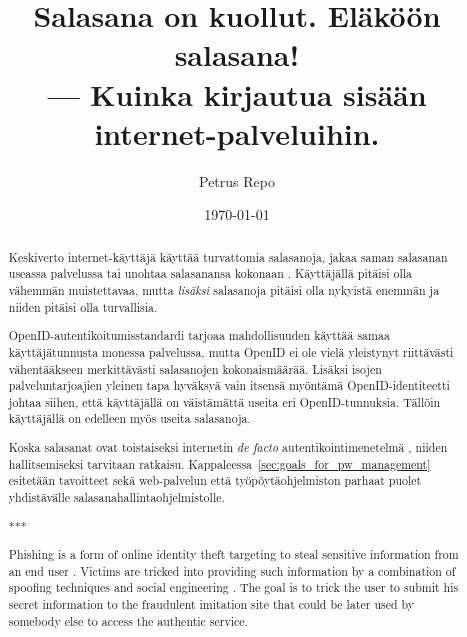 \documentclass[english,gradu]{tktltiki}
\begin{document}
\title{Salasana on kuollut. Eläköön salasana!\\ --- Kuinka kirjautua sisään internet-palveluihin.}
\author{Petrus Repo}
\date{\today}
\maketitle


\onehalfspacing

\subject{Tietojenkäsittelytiede}


\begin{abstract}

Keskiverto internet-käyttäjä käyttää turvattomia salasanoja, jakaa saman salasanan useassa palvelussa tai unohtaa salasanansa kokonaan \cite{study_of_passwords_07, password_management_strategies_06, generating_and_remembering_pws_04, users_are_not_the_enemy_99}. Käyttäjällä pitäisi olla vähemmän muistettavaa, mutta \emph{lisäksi} salasanoja pitäisi olla nykyistä enemmän ja niiden pitäisi olla turvallisia.

OpenID-autentikoitumisstandardi tarjoaa mahdollisuuden käyttää samaa käyttäjätunnusta monessa palvelussa, mutta OpenID ei ole vielä yleistynyt riittävästi vähentääkseen merkittävästi salasanojen kokonaismäärää. Lisäksi isojen palveluntarjoajien yleinen tapa hyväksyä vain itsensä myöntämä OpenID-identiteetti johtaa siihen, että käyttäjällä on väistämättä useita eri OpenID-tunnuksia. Tällöin käyttäjällä on edelleen myös useita salasanoja.

Koska salasanat ovat toistaiseksi internetin \emph{de facto} autentikointimenetelmä \cite{study_of_passwords_07, passpet_06, password_management_strategies_06, pwdhash_extension_05}, niiden hallitsemiseksi tarvitaan ratkaisu. Kappaleessa~\ref{sec:goals_for_pw_management} esitetään tavoitteet sekä web-palvelun että työpöytäohjelmiston parhaat puolet yhdistävälle salasanahallintaohjelmistolle.

***

Phishing is a form of online identity theft targeting to steal sensitive information from an end user   \cite{phishing_attacks_and_solutions_2007, why_phishing_works_06, suspectibility_to_phishing_2006}. Victims are tricked into providing such information by a combination of spoofing techniques and social engineering \cite{visual_similarity_phishing_2008}. The goal is to trick the user to submit his secret information to the fraudulent imitation site that could be later used by somebody else to access the authentic service.


\end{abstract}
\end{document}
